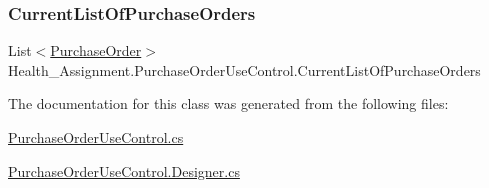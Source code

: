 \mbox{\label{class_health___assignment_1_1_purchase_order_use_control_a49ff72a95ae04191e583b17a3027f2a7}} 
\subsubsection{\texorpdfstring{Current\+List\+Of\+Purchase\+Orders}{CurrentListOfPurchaseOrders}}
{\footnotesize\ttfamily List$<$\hyperlink{class_health___assignment_1_1_purchase_order}{Purchase\+Order}$>$ Health\+\_\+\+Assignment.\+Purchase\+Order\+Use\+Control.\+Current\+List\+Of\+Purchase\+Orders}



The documentation for this class was generated from the following files\+:\begin{DoxyCompactItemize}
\item 
\hyperlink{_purchase_order_use_control_8cs}{Purchase\+Order\+Use\+Control.\+cs}\item 
\hyperlink{_purchase_order_use_control_8_designer_8cs}{Purchase\+Order\+Use\+Control.\+Designer.\+cs}\end{DoxyCompactItemize}
